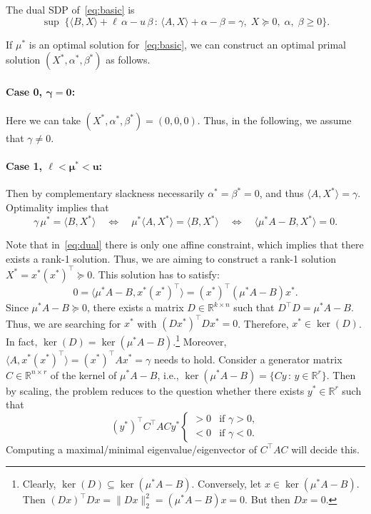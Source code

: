 \documentclass[10pt, a4paper]{article}
\newcommand{\suchthat}{\,:\,}
\newcommand{\norm}[1]{\lVert{#1}\rVert}
\newcommand{\skal}[2]{\langle{#1},{#2}\rangle}
\newcommand{\T}{^{\top}}
\newcommand{\R}{\mathds{R}}
\begin{document}
The dual SDP of~\eqref{eq:basic} is
\begin{equation}\label{eq:dual}
  \sup\; \{\skal{B}{X} + \ell\, \alpha - u\, \beta \suchthat \skal{A}{X} +
  \alpha - \beta = \gamma,\; X \succeq 0,\; \alpha,\; \beta \geq 0\}.
\end{equation}

If $\mu^*$ is an optimal solution for~\eqref{eq:basic}, we can construct an
optimal primal solution $(X^*, \alpha^*, \beta^*)$ as follows.

\paragraph{Case 0, $\boldsymbol{\gamma = 0}$:}

Here we can take $(X^*, \alpha^*, \beta^*) = (0,0,0)$. Thus, in the
following, we assume that $\gamma \neq 0$.

\paragraph{Case 1, $\boldsymbol{\ell < \mu^* < u}$:}

Then by complementary slackness necessarily $\alpha^* = \beta^* = 0$, and
thus $\skal{A}{X^*} = \gamma$. Optimality implies that
\[
\gamma\, \mu^* = \skal{B}{X^*}
\quad\Leftrightarrow\quad
\mu^* \skal{A}{X^*} = \skal{B}{X^*}
\quad\Leftrightarrow\quad
\skal{\mu^* A - B}{X^*} = 0.
\]

Note that in~\eqref{eq:dual} there is only one affine constraint, which
implies that there exists a rank-1 solution. Thus, we are aiming to
construct a rank-1 solution $X^* = x^* (x^*)\T \succeq 0$.  This solution
has to satisfy:
\[
0 = \skal{\mu^* A - B}{x^* (x^*)\T} = (x^*)\T (\mu^* A - B) x^*.
\]
Since $\mu^* A - B \succeq 0$, there exists a matrix
$D \in \R^{k \times n}$ such that $D\T D = \mu^* A - B$. Thus, we are
searching for $x^*$ with $(D x^*)\T D x^* = 0$. Therefore,
$x^* \in \ker(D)$. In fact,
$\ker(D) = \ker(\mu^* A - B)$.\footnote{Clearly,
  $\ker(D) \subseteq \ker(\mu^* A - B)$. Conversely, let
  $x \in \ker(\mu^* A - B)$. Then
  $(Dx)\T Dx = \norm{Dx}_2^2 = (\mu^* A - B)x = 0$. But then $Dx = 0$.}
Moreover, $\skal{A}{x^*(x^*)\T} = (x^*)\T A x^* = \gamma$ needs to hold.
Consider a generator matrix $C \in \R^{n \times r}$ of the kernel of
$\mu^* A - B$, i.e., $\ker(\mu^* A - B) = \{C y \suchthat y \in \R^r\}$.
Then by scaling, the problem reduces to the question whether there exists
$y^* \in \R^r$ such that
\[
(y^*)\T C\T A C y^*
\begin{cases}
  > 0 & \text{if } \gamma > 0,\\
  < 0 & \text{if } \gamma < 0.
\end{cases}
\]
Computing a maximal/minimal eigenvalue/eigenvector of $C\T A C$ will decide
this.
\end{document}

